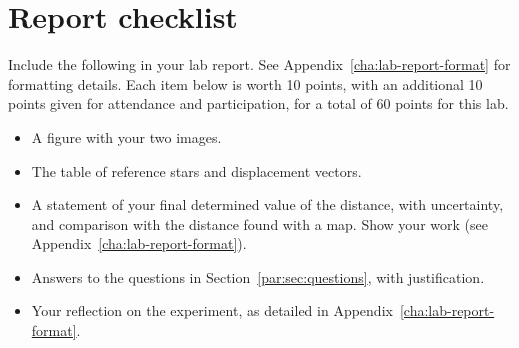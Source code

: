 \section{Report checklist}

Include the following in your lab report. See Appendix~\ref{cha:lab-report-format} for formatting details. Each item below is worth 10 points, with an additional 10 points given for attendance and participation, for a total of 60 points for this lab.

\begin{itemize}
	\item A figure with your two images.
	\item The table of reference stars and displacement vectors.
	\item A statement of your final determined value of the distance, with uncertainty, and comparison with the distance found with a map. Show your work (see Appendix~\ref{cha:lab-report-format}).
	\item Answers to the questions in Section~\ref{par:sec:questions}, with justification.
	\item Your reflection on the experiment, as detailed in Appendix~\ref{cha:lab-report-format}.
\end{itemize}